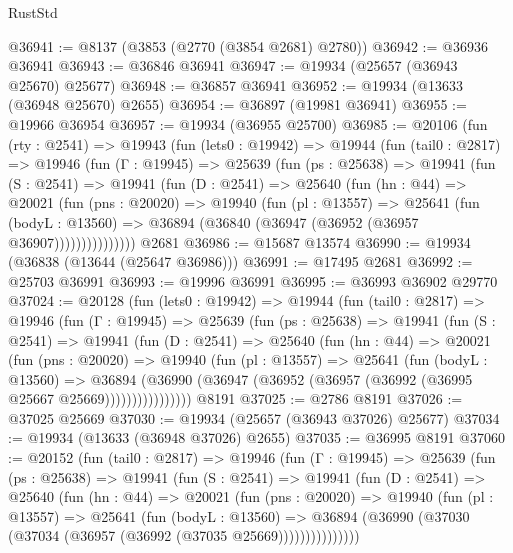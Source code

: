 \begin{lexlean}{RustStd}
\begin{coremodule}
@36941 := @8137 (@3853 (@2770 (@3854 @2681) @2780))
@36942 := @36936 @36941
@36943 := @36846 @36941
@36947 := @19934 (@25657 (@36943 @25670) @25677)
@36948 := @36857 @36941
@36952 := @19934 (@13633 (@36948 @25670) @2655)
@36954 := @36897 (@19981 @36941)
@36955 := @19966 @36954
@36957 := @19934 (@36955 @25700)
@36985 := @20106
    (fun (rty : @2541) =>
    @19943
      (fun (lets0 : @19942) =>
      @19944
        (fun (tail0 : @2817) =>
        @19946
          (fun (Γ : @19945) =>
          @25639
            (fun (ps : @25638) =>
            @19941
              (fun (S : @2541) =>
              @19941
                (fun (D : @2541) =>
                @25640
                  (fun (hn : @44) =>
                  @20021
                    (fun (pns : @20020) =>
                    @19940
                      (fun (pl : @13557) =>
                      @25641
                        (fun (bodyL : @13560) =>
                        @36894 (@36840 (@36947 (@36952 (@36957 @36907)))))))))))))))
    @2681
@36986 := @15687 @13574
@36990 := @19934 (@36838 (@13644 (@25647 @36986)))
@36991 := @17495 @2681
@36992 := @25703 @36991
@36993 := @19996 @36991
@36995 := @36993 @36902 @29770
@37024 := @20128
    (fun (lets0 : @19942) =>
    @19944
      (fun (tail0 : @2817) =>
      @19946
        (fun (Γ : @19945) =>
        @25639
          (fun (ps : @25638) =>
          @19941
            (fun (S : @2541) =>
            @19941
              (fun (D : @2541) =>
              @25640
                (fun (hn : @44) =>
                @20021
                  (fun (pns : @20020) =>
                  @19940
                    (fun (pl : @13557) =>
                    @25641
                      (fun (bodyL : @13560) =>
                      @36894
                        (@36990
                          (@36947 (@36952 (@36957 (@36992 (@36995 @25667 @25669))))))))))))))))
    @8191
@37025 := @2786 @8191
@37026 := @37025 @25669
@37030 := @19934 (@25657 (@36943 @37026) @25677)
@37034 := @19934 (@13633 (@36948 @37026) @2655)
@37035 := @36995 @8191
@37060 := @20152
    (fun (tail0 : @2817) =>
    @19946
      (fun (Γ : @19945) =>
      @25639
        (fun (ps : @25638) =>
        @19941
          (fun (S : @2541) =>
          @19941
            (fun (D : @2541) =>
            @25640
              (fun (hn : @44) =>
              @20021
                (fun (pns : @20020) =>
                @19940
                  (fun (pl : @13557) =>
                  @25641
                    (fun (bodyL : @13560) =>
                    @36894 (@36990 (@37030 (@37034 (@36957 (@36992 (@37035 @25669)))))))))))))))

\end{coremodule}
\end{lexlean}
